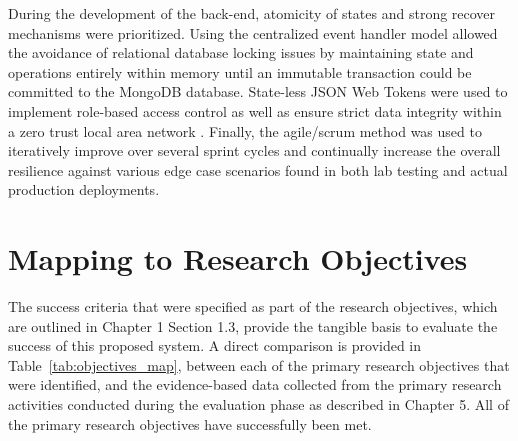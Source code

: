 During the development of the back-end, atomicity of states and strong recover mechanisms were prioritized. Using the centralized event handler model allowed the avoidance of relational database locking issues by maintaining state and operations entirely within memory until an immutable transaction could be committed to the MongoDB database. State-less JSON Web Tokens \cite{ferraiolo1992rbac} were used to implement role-based access control as well as ensure strict data integrity within a zero trust local area network \cite{nist2020zero}. Finally, the agile/scrum method \cite{scrum2020guide} was used to iteratively improve over several sprint cycles and continually increase the overall resilience against various edge case scenarios found in both lab testing and actual production deployments.

\section{Mapping to Research Objectives}
The success criteria that were specified as part of the research objectives, which are outlined in Chapter 1 Section 1.3, provide the tangible basis to evaluate the success of this proposed system. A direct comparison is provided in Table~\ref{tab:objectives_map}, between each of the primary research objectives that were identified, and the evidence-based data collected from the primary research activities conducted during the evaluation phase as described in Chapter 5. All of the primary research objectives have successfully been met.

